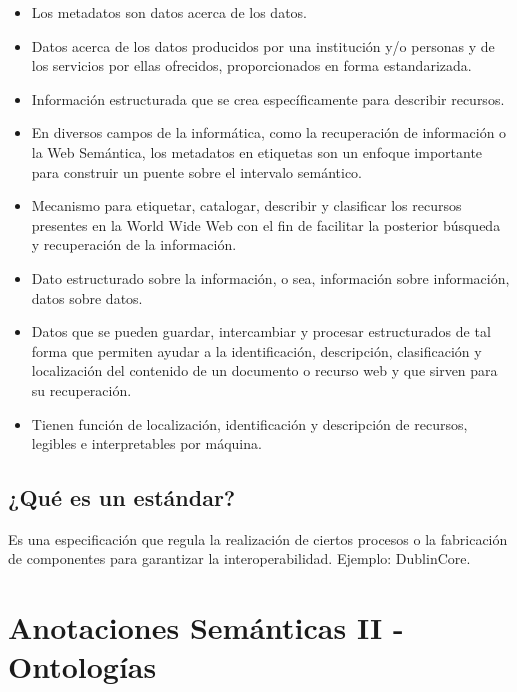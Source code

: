 \documentclass[a4paper,12pt,twoside,final,spanish]{article}
\begin{document}
\begin{itemize}
\item Los metadatos son datos acerca de los datos.

\item Datos acerca de los datos producidos por una institución y/o personas y de los servicios por ellas ofrecidos, proporcionados en forma estandarizada.

\item Información estructurada que se crea específicamente para describir recursos.

\item En diversos campos de la informática, como la recuperación de información o la Web Semántica, los metadatos en etiquetas son un enfoque importante para construir un puente sobre el intervalo semántico.

\item Mecanismo para etiquetar, catalogar, describir y clasificar los recursos presentes en la World Wide Web con el fin de facilitar la posterior búsqueda y recuperación de la información.

\item Dato estructurado sobre la información, o sea, información sobre información, datos sobre datos. 

\item Datos que se pueden guardar, intercambiar y procesar estructurados de tal forma que permiten ayudar a la identificación, descripción, clasificación y localización del 
contenido de un documento o recurso web y que sirven para su recuperación.

\item Tienen función de localización, identificación y descripción de recursos, legibles e interpretables por máquina.
\end{itemize}

\subsection{¿Qué es un estándar?}

Es una especificación que regula la realización de ciertos procesos o la fabricación de componentes para garantizar la interoperabilidad. Ejemplo: DublinCore.

\section{Anotaciones Semánticas II - Ontologías}
\end{document}
